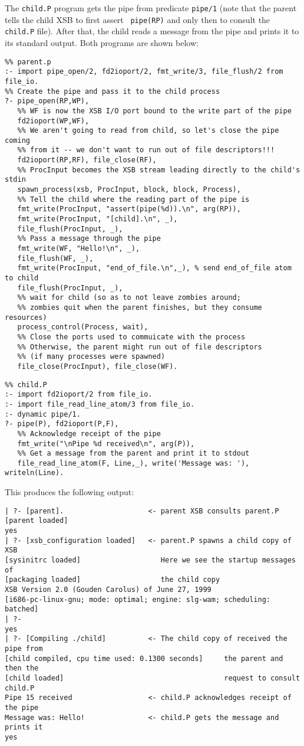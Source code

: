 \begin{description}
    The {\tt child.P} program gets the pipe from predicate {\tt pipe/1}
    (note that the parent tells the child XSB to first assert {\tt
    pipe(RP)} and only then to consult the {\tt child.P} file).
  After that, the child reads a message from the pipe and prints it to its
    standard output. Both programs are shown below:
    \begin{verbatim}
%% parent.p      
:- import pipe_open/2, fd2ioport/2, fmt_write/3, file_flush/2 from file_io.
%% Create the pipe and pass it to the child process
?- pipe_open(RP,WP),
   %% WF is now the XSB I/O port bound to the write part of the pipe
   fd2ioport(WP,WF),
   %% We aren't going to read from child, so let's close the pipe coming 
   %% from it -- we don't want to run out of file descriptors!!!
   fd2ioport(RP,RF), file_close(RF),
   %% ProcInput becomes the XSB stream leading directly to the child's stdin
   spawn_process(xsb, ProcInput, block, block, Process),
   %% Tell the child where the reading part of the pipe is
   fmt_write(ProcInput, "assert(pipe(%d)).\n", arg(RP)),
   fmt_write(ProcInput, "[child].\n", _),
   file_flush(ProcInput, _),
   %% Pass a message through the pipe
   fmt_write(WF, "Hello!\n", _),
   file_flush(WF, _),
   fmt_write(ProcInput, "end_of_file.\n",_), % send end_of_file atom to child
   file_flush(ProcInput, _),
   %% wait for child (so as to not leave zombies around; 
   %% zombies quit when the parent finishes, but they consume resources)
   process_control(Process, wait),
   %% Close the ports used to commuicate with the process
   %% Otherwise, the parent might run out of file descriptors 
   %% (if many processes were spawned)
   file_close(ProcInput), file_close(WF).
    \end{verbatim}
    \begin{verbatim}
%% child.P
:- import fd2ioport/2 from file_io.
:- import file_read_line_atom/3 from file_io.
:- dynamic pipe/1.
?- pipe(P), fd2ioport(P,F),
   %% Acknowledge receipt of the pipe
   fmt_write("\nPipe %d received\n", arg(P)),
   %% Get a message from the parent and print it to stdout
   file_read_line_atom(F, Line,_), write('Message was: '), writeln(Line).
    \end{verbatim}
    This produces the following output:
    \begin{verbatim}
| ?- [parent].                    <- parent XSB consults parent.P
[parent loaded]
yes
| ?- [xsb_configuration loaded]   <- parent.P spawns a child copy of XSB
[sysinitrc loaded]                   Here we see the startup messages of
[packaging loaded]                   the child copy
XSB Version 2.0 (Gouden Carolus) of June 27, 1999
[i686-pc-linux-gnu; mode: optimal; engine: slg-wam; scheduling: batched]
| ?- 
yes
| ?- [Compiling ./child]          <- The child copy of received the pipe from
[child compiled, cpu time used: 0.1300 seconds]     the parent and then the
[child loaded]                                      request to consult child.P
Pipe 15 received                  <- child.P acknowledges receipt of the pipe
Message was: Hello!               <- child.P gets the message and prints it
yes       
    \end{verbatim}
    

\end{description}
